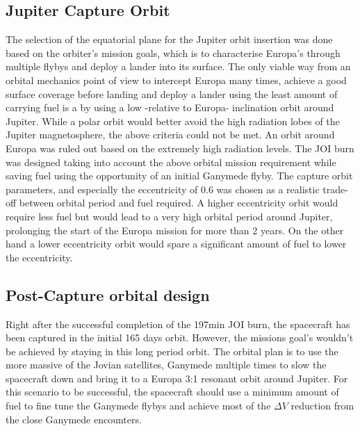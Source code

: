 \subsection{Jupiter Capture Orbit}
 The selection of the equatorial plane for the Jupiter orbit insertion was done based on the orbiter's mission goals, which is to characterise Europa’s through multiple flybys and deploy a lander into its surface. The only viable way from an orbital mechanics point of view to intercept Europa many times, achieve a good surface coverage before landing and deploy a lander using the least amount of carrying fuel is a by using a low -relative to Europa- inclination orbit around Jupiter. While a polar orbit would better avoid the high radiation lobes of the Jupiter magnetosphere, the above criteria could not be met. An orbit around Europa was ruled out based on the extremely high radiation levels. The JOI burn was designed taking into account the above orbital mission requirement while saving fuel using the opportunity of an initial Ganymede flyby. The capture orbit parameters, and especially the eccentricity of 0.6 was chosen as a realistic trade-off between orbital period and fuel required. A higher eccentricity orbit would require less fuel but would lead to a very high orbital period around Jupiter, prolonging the start of the Europa mission for more than 2 years. On the other hand a lower eccentricity orbit would spare a significant amount of fuel to lower the eccentricity.
\subsection{Post-Capture orbital design}
Right after the successful completion of the 197min JOI burn, the spacecraft has been captured in the initial 165 days orbit. However, the missions goal's wouldn't be achieved by staying in this long period orbit. The orbital plan is to use the more massive of the Jovian satellites, Ganymede multiple times to slow the spacecraft down and bring it to a Europa 3:1 resonant orbit around Jupiter. For this scenario to be successful, the spacecraft should use a minimum amount of fuel to fine tune the Ganymede flybys and achieve most of the $\Delta V$ reduction from the close Ganymede encounters. 
